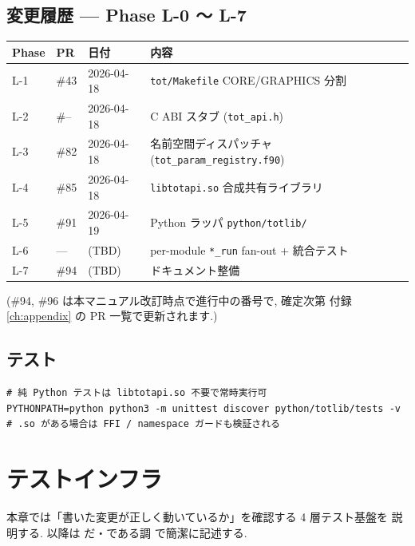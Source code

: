 \documentclass[11pt,a4paper]{report}
\begin{document}
\section{変更履歴 — Phase L-0 〜 L-7}

\begin{center}
\small
\begin{tabular}{@{}lllp{6.5cm}@{}}
\toprule
Phase & PR & 日付 & 内容 \\ \midrule
L-1 & \#43 & 2026-04-18 & \texttt{tot/Makefile} CORE/GRAPHICS 分割 \\
L-2 & \#-- & 2026-04-18 & C ABI スタブ (\texttt{tot\_api.h}) \\
L-3 & \#82 & 2026-04-18 & 名前空間ディスパッチャ (\texttt{tot\_param\_registry.f90}) \\
L-4 & \#85 & 2026-04-18 & \texttt{libtotapi.so} 合成共有ライブラリ \\
L-5 & \#91 & 2026-04-19 & Python ラッパ \texttt{python/totlib/} \\
L-6 & — & (TBD) & per-module \texttt{*\_run} fan-out + 統合テスト \\
L-7 & \#94 & (TBD) & ドキュメント整備 \\
\bottomrule
\end{tabular}
\end{center}

(\#94, \#96 は本マニュアル改訂時点で進行中の番号で, 確定次第
付録 \ref{ch:appendix} の PR 一覧で更新されます.)

\section{テスト}

\begin{lstlisting}[style=bash]
# 純 Python テストは libtotapi.so 不要で常時実行可
PYTHONPATH=python python3 -m unittest discover python/totlib/tests -v
# .so がある場合は FFI / namespace ガードも検証される
\end{lstlisting}

\clearpage
\chapter{テストインフラ}
\label{ch:tests}

\begin{learn}
本章では「書いた変更が正しく動いているか」を確認する 4 層テスト基盤を
説明する. 以降は だ・である調 で簡潔に記述する.
\end{learn}
\end{document}
